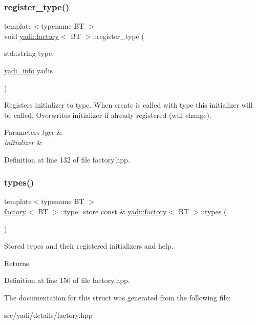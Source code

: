 \subsubsection{\texorpdfstring{register\+\_\+type()}{register\_type()}}
{\footnotesize\ttfamily template$<$typename BT $>$ \\
void \hyperlink{structyadi_1_1factory}{yadi\+::factory}$<$ BT $>$\+::register\+\_\+type (\begin{DoxyParamCaption}\item[{std\+::string}]{type,  }\item[{\hyperlink{structyadi_1_1factory_1_1yadi__info}{yadi\+\_\+info}}]{yadis }\end{DoxyParamCaption})\hspace{0.3cm}{\ttfamily [static]}}



Registers initializer to type. When create is called with type this initializer will be called. Overwrites initializer if already registered (will change). 


\begin{DoxyParams}{Parameters}
{\em type} & \\
\hline
{\em initializer} & \\
\hline
\end{DoxyParams}


Definition at line 132 of file factory.\+hpp.

\mbox{\label{structyadi_1_1factory_aa167d70b963561d24c8a32f680d7e8c0}} 
\subsubsection{\texorpdfstring{types()}{types()}}
{\footnotesize\ttfamily template$<$typename BT $>$ \\
\hyperlink{structyadi_1_1factory}{factory}$<$ BT $>$\+::type\+\_\+store const  \& \hyperlink{structyadi_1_1factory}{yadi\+::factory}$<$ BT $>$\+::types (\begin{DoxyParamCaption}{ }\end{DoxyParamCaption})\hspace{0.3cm}{\ttfamily [static]}}



Stored types and their registered initializers and help. 

\begin{DoxyReturn}{Returns}

\end{DoxyReturn}


Definition at line 150 of file factory.\+hpp.



The documentation for this struct was generated from the following file\+:\begin{DoxyCompactItemize}
\item 
src/yadi/details/factory.\+hpp\end{DoxyCompactItemize}
